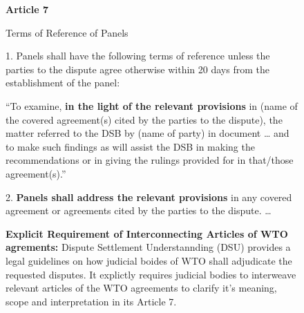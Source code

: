 \begin{figure}
  \begin{displayquote}[][]
    \begin{center}
      \textbf{Article 7}
    \end{center}
    \begin{center}
      Terms of Reference of Panels
    \end{center}
  
    1. Panels shall have the following terms of reference unless the parties to the dispute
    agree otherwise within 20 days from the establishment of the panel:
  
    \begin{displayquote}[][]
  
      ``To examine, \textbf{in the light of the relevant provisions} in (name of the covered
      agreement(s) cited by the parties to the dispute), the matter referred to the DSB by
      (name of party) in document … and to make such findings as will assist the DSB in
      making the recommendations or in giving the rulings provided for in that/those
      agreement(s).''
        
    \end{displayquote}
  
    2. \textbf{Panels shall address the relevant provisions} in any covered agreement or agreements
    cited by the parties to the dispute. \ldots
  \end{displayquote}
  \caption{\textbf{Explicit Requirement of Interconnecting Articles of WTO agrements:} Dispute Settlement Understannding (DSU) provides a legal guidelines on how judicial boides of WTO shall adjudicate the requested disputes.
  It explictly requires judicial bodies to interweave relevant articles of the WTO agreements to clarify
  it's meaning, scope and interpretation in its Article 7.
  } 
  \label{fig:art7dsu}
\end{figure}

